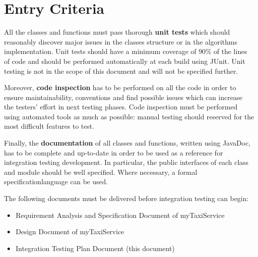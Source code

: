 \section{Entry Criteria}
\label{sec:entry-criteria}

All the classes and functions must pass thorough \textbf{unit tests} which should reasonably discover major issues in the classes structure or in the algorithms implementation. Unit tests should have a minimum coverage of 90\% of the lines of code and should be performed automatically at each build using JUnit. Unit testing is not in the scope of this document and will not be specified further.

Moreover, \textbf{code inspection} has to be performed on all the code in order to ensure maintainability, conventions and find possible issues which can increase the testers' effort in next testing phases. Code inspection must be performed using automated tools as much as possible: manual testing should reserved for the most difficult features to test.

Finally, the \textbf{documentation} of all classes and functions, written using JavaDoc, has to be complete and up-to-date in order to be used as a reference for integration testing development. In particular, the public interfaces of each class and module should be well specified. Where necessary, a formal specificationlanguage can be used.

The following documents must be delivered before integration testing can begin:
\begin{itemize}
    \item Requirement Analysis and Specification Document of myTaxiService
    \item Design Document of myTaxiService
    \item Integration Testing Plan Document (this document)
\end{itemize}
